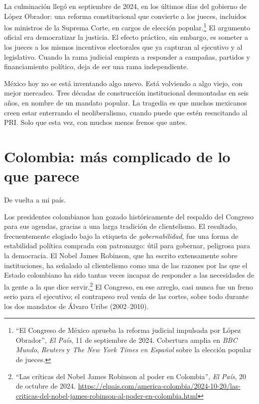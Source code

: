 \documentclass[11pt,letterpaper]{article}
\begin{document}
La culminación llegó en septiembre de 2024, en los últimos días del gobierno de López Obrador: una reforma constitucional que convierte a los jueces, incluidos los ministros de la Suprema Corte, en cargos de elección popular.\footnote{``El Congreso de México aprueba la reforma judicial impulsada por López Obrador'', \textit{El País}, 11 de septiembre de 2024. Cobertura amplia en \textit{BBC Mundo}, \textit{Reuters} y \textit{The New York Times en Español} sobre la elección popular de jueces.} El argumento oficial era democratizar la justicia. El efecto práctico, sin embargo, es someter a los jueces a los mismos incentivos electorales que ya capturan al ejecutivo y al legislativo. Cuando la rama judicial empieza a responder a campañas, partidos y financiamiento político, deja de ser una rama independiente.

México hoy no se está inventando algo nuevo. Está volviendo a algo viejo, con mejor mercadeo. Tres décadas de construcción institucional desmontadas en seis años, en nombre de un mandato popular. La tragedia es que muchos mexicanos creen estar enterrando el neoliberalismo, cuando puede que estén resucitando al PRI. Solo que esta vez, con muchos menos frenos que antes.

\section{Colombia: más complicado de lo que parece}

De vuelta a mi país.

Los presidentes colombianos han gozado históricamente del respaldo del Congreso para sus agendas, gracias a una larga tradición de clientelismo. El resultado, frecuentemente elogiado bajo la etiqueta de \textit{gobernabilidad}, fue una forma de estabilidad política comprada con patronazgo: útil para gobernar, peligrosa para la democracia. El Nobel James Robinson, que ha escrito extensamente sobre instituciones, ha señalado al clientelismo como una de las razones por las que el Estado colombiano ha sido tantas veces incapaz de responder a las necesidades de la gente a la que dice servir.\footnote{``Las críticas del Nobel James Robinson al poder en Colombia'', \textit{El País}, 20 de octubre de 2024. \url{https://elpais.com/america-colombia/2024-10-20/las-criticas-del-nobel-james-robinson-al-poder-en-colombia.html}} El Congreso, en ese arreglo, casi nunca fue un freno serio para el ejecutivo; el contrapeso real venía de las cortes, sobre todo durante los dos mandatos de Álvaro Uribe (2002--2010).
\end{document}
